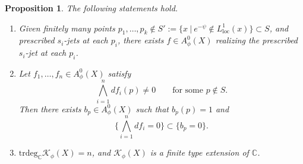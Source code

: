 \documentclass[10pt,a4paper]{amsart}
\newtheorem{prop}{Proposition}
\newcommand{\cK}{\mathcal{K}}
\newcommand{\loc}{\mathrm{loc}}
\newcommand{\trdeg}{\mathrm{trdeg}}
\begin{document}
\begin{prop}\label{jet}
The following statements hold.
\begin{enumerate}
\item[(a)] Given finitely many points $p_1,\dots,p_k\notin S':=\{x~|~e^{-\psi}\notin L^1_\loc(x)\}\subset S$, and prescribed $s_i$-jets at each
$p_i$, there exists $f\in A_\phi^0(X)$ realizing the prescribed $s_i$-jet at each $p_i$.

\item[(b)] Let $f_1,\dots,f_n\in A_\phi^0(X)$ satisfy
\[
\bigwedge_{i=1}^n df_i(p)\neq 0
\qquad\text{for some }p\notin S.
\]
Then there exists $b_p\in A_\phi^0(X)$ such that $b_p(p)=1$ and
\[
\{\textstyle\bigwedge_{i=1}^n df_i=0\}\subset \{b_p=0\}.
\]

\item[(c)] $\trdeg_\mathbb{C}\cK_\phi(X)=n$, and $\cK_\phi(X)$ is a finite type extension of $\mathbb{C}$.
\end{enumerate}
\end{prop}
\end{document}

